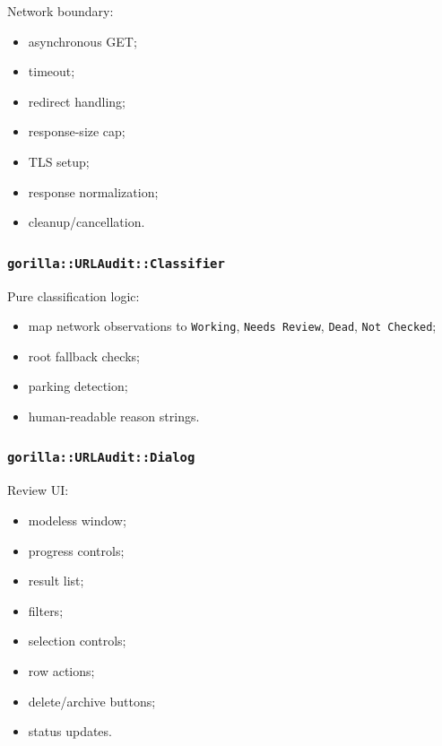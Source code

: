 \documentclass[
  letterpaper,
]{article}
\newcommand{\passthrough}[1]{#1}
\providecommand{\tightlist}{%
  \setlength{\itemsep}{0pt}\setlength{\parskip}{0pt}}
\begin{document}
Network boundary:

\begin{itemize}
\tightlist
\item
  asynchronous GET;
\item
  timeout;
\item
  redirect handling;
\item
  response-size cap;
\item
  TLS setup;
\item
  response normalization;
\item
  cleanup/cancellation.
\end{itemize}

\subsubsection{\texorpdfstring{\nolinkurl{gorilla::URLAudit::Classifier}}{}}\label{gorillaurlauditclassifier}

Pure classification logic:

\begin{itemize}
\tightlist
\item
  map network observations to \passthrough{\lstinline!Working!}, \passthrough{\lstinline!Needs Review!},
  \passthrough{\lstinline!Dead!}, \passthrough{\lstinline!Not Checked!};
\item
  root fallback checks;
\item
  parking detection;
\item
  human-readable reason strings.
\end{itemize}

\subsubsection{\texorpdfstring{\nolinkurl{gorilla::URLAudit::Dialog}}{}}\label{gorillaurlauditdialog}

Review UI:

\begin{itemize}
\tightlist
\item
  modeless window;
\item
  progress controls;
\item
  result list;
\item
  filters;
\item
  selection controls;
\item
  row actions;
\item
  delete/archive buttons;
\item
  status updates.
\end{itemize}
\end{document}
